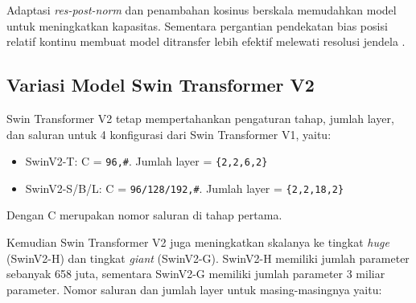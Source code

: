 

Adaptasi \emph{res-post-norm} dan penambahan kosinus berskala memudahkan model untuk \linebreak meningkatkan kapasitas. Sementara pergantian pendekatan bias posisi relatif kontinu membuat model ditransfer lebih 
efektif melewati resolusi jendela \parencite{Liuv22021}.

\subsection{Variasi Model Swin Transformer V2}

Swin Transformer V2 tetap mempertahankan pengaturan tahap, jumlah layer, dan saluran untuk 4 konfigurasi dari Swin Transformer V1, yaitu:

\begin{itemize}[nolistsep]

  \item SwinV2-T: C = \verb|96,#|. Jumlah layer = \verb|{2,2,6,2}|

  \item SwinV2-S/B/L: C = \verb|96/128/192,#|. Jumlah layer = \verb|{2,2,18,2}|

\end{itemize}

Dengan C merupakan nomor saluran di tahap pertama.

Kemudian Swin Transformer V2 juga meningkatkan skalanya ke tingkat \emph{huge} (SwinV2-H) dan tingkat \emph{giant} (SwinV2-G). SwinV2-H memiliki jumlah parameter sebanyak 658 juta, sementara SwinV2-G memiliki 
jumlah parameter 3 miliar parameter. Nomor saluran dan jumlah layer untuk masing-masingnya yaitu:

